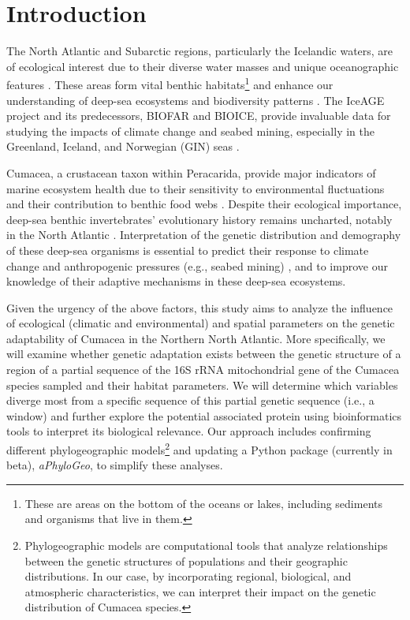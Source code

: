 \section{Introduction}\label{introduction}
The North Atlantic and Subarctic regions, particularly the Icelandic waters, are of ecological interest due to their diverse water masses and unique oceanographic features \citep{schnurr_composition_2014, meisner_benthic_2014, uhlir_adding_2021}. These areas form vital {benthic habitats}\footnote{These are areas on the bottom of the oceans or lakes, including sediments and organisms that live in them.} \citep{levin2009ecological} and enhance our understanding of deep-sea ecosystems and biodiversity patterns \citep{rogers2007corals, danovaro2008exponential, uhlir_adding_2021}. The IceAGE project and its predecessors, BIOFAR and BIOICE, provide invaluable data for studying the impacts of climate change and seabed mining, especially in the Greenland, Iceland, and Norwegian (GIN) seas \citep{meisner_prefacebiodiversity_2018}.

Cumacea, a crustacean taxon within Peracarida, provide major indicators of marine ecosystem health due to their sensitivity to environmental fluctuations \citep{stransky_diversity_2010} and their contribution to benthic food webs \citep{rehm2009cumacea}. Despite their ecological importance, deep-sea benthic invertebrates’ evolutionary history remains uncharted, notably in the North Atlantic \citep{jennings_phylogeographic_2014}. Interpretation of the genetic distribution and demography of these deep-sea organisms is essential to predict their response to climate change \citep{jennings_phylogeographic_2014} and anthropogenic pressures (e.g., seabed mining) \citep{meisner_prefacebiodiversity_2018}, and to improve our knowledge of their adaptive mechanisms in these deep-sea ecosystems.

Given the urgency of the above factors, this study aims to analyze the influence of ecological (climatic and environmental) and spatial parameters on the genetic adaptability of Cumacea in the Northern North Atlantic. More specifically, we will examine whether genetic adaptation exists between the genetic structure of a region of a partial sequence of the 16S rRNA mitochondrial gene of the Cumacea species sampled and their habitat parameters. We will determine which variables diverge most from a specific sequence of this partial genetic sequence (i.e., a window) and further explore the potential associated protein using bioinformatics tools to interpret its biological relevance. Our approach includes confirming different {phylogeographic models}\footnote{Phylogeographic models are computational tools that analyze relationships between the genetic structures of populations and their geographic distributions. In our case, by incorporating regional, biological, and atmospheric characteristics, we can interpret their impact on the genetic distribution of Cumacea species.} and updating a Python package (currently in beta), \textit{aPhyloGeo}, to simplify these analyses.

